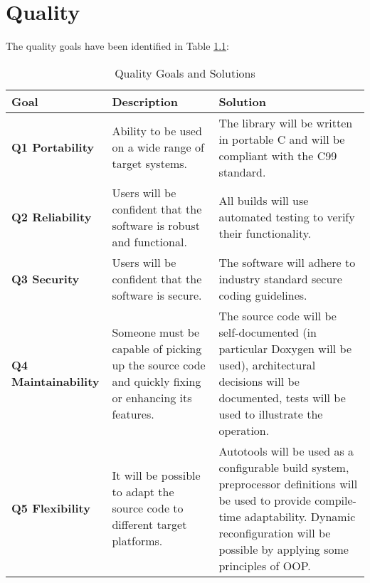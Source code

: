 \chapter{Quality}
\label{ch_quality}

The quality goals have been identified in Table \ref{table:quality_goals}:


\begin{table}[h]
\centering
\caption{Quality Goals and Solutions}
\label{table:quality_goals}
\begin{tabularx}{\textwidth}{l p{5cm} p{8cm}}
\toprule
\textbf{Goal} &\textbf{Description}  &\textbf{Solution}  \\
\midrule
\textbf{Q1 Portability} &Ability to be used on a wide range of target systems. &The library will be written in portable C and will be compliant with the C99 standard. \\
\midrule
\textbf{Q2 Reliability} &Users will be confident that the software is robust and functional. &All builds will use automated testing to verify their functionality. \\
\midrule
\textbf{Q3 Security} &Users will be confident that the software is secure. &The software will adhere to industry standard secure coding guidelines. \\
\midrule
\textbf{Q4 Maintainability} &Someone must be capable of picking up the source code and quickly fixing or enhancing its features. &The source code will be self-documented (in particular Doxygen will be used), architectural decisions will be documented, tests will be used to illustrate the operation. \\
\midrule
\textbf{Q5 Flexibility} &It will be possible to adapt the source code to different target platforms. &Autotools will be used as a configurable build system, preprocessor definitions will be used to provide compile-time adaptability. Dynamic reconfiguration will be possible by applying some principles of OOP. \\
\bottomrule
\end{tabularx}
\end{table}

